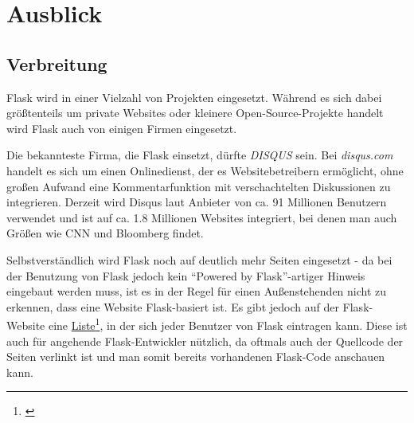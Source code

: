 \chapter{Ausblick}

\section{Verbreitung}
Flask wird in einer Vielzahl von Projekten eingesetzt. Während es sich dabei größtenteils um private
Websites oder kleinere Open-Source-Projekte handelt wird Flask auch von einigen Firmen eingesetzt.

Die bekannteste Firma, die Flask einsetzt, dürfte \emph{DISQUS} sein. Bei \emph{disqus.com} handelt
es sich um einen Onlinedienst, der es Websitebetreibern ermöglicht, ohne großen Aufwand eine
Kommentarfunktion mit verschachtelten Diskussionen zu integrieren. Derzeit wird Disqus laut Anbieter
von ca. 91 Millionen Benutzern verwendet und ist auf ca. 1.8 Millionen Websites integriert, bei
denen man auch Größen wie CNN und Bloomberg findet.


Selbstverständlich wird Flask noch auf deutlich mehr Seiten eingesetzt - da bei der Benutzung von
Flask jedoch kein \enquote{Powered by Flask}-artiger Hinweis eingebaut werden muss, ist es in der
Regel für einen Außenstehenden nicht zu erkennen, dass eine Website Flask-basiert ist. Es gibt
jedoch auf der Flask-Website eine
\href{http://flask.pocoo.org/community/poweredby/}{Liste}\footnote{\citep{poweredbyflask}}, in der
sich jeder Benutzer von Flask eintragen kann. Diese ist auch für angehende Flask-Entwickler
nützlich, da oftmals auch der Quellcode der Seiten verlinkt ist und man somit bereits vorhandenen
Flask-Code anschauen kann.

